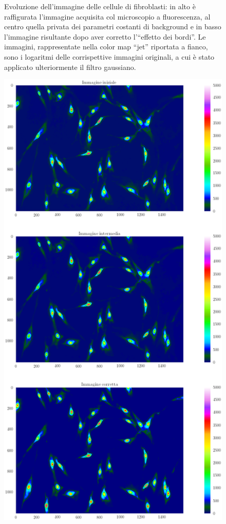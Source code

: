 \begin{figure}
 \caption{\small{Evoluzione dell'immagine delle cellule di fibroblasti: in alto è raffigurata l'immagine acquisita col microscopio a fluorescenza, al centro quella privata dei parametri costanti di background e in basso l'immagine risultante dopo aver corretto l'``effetto dei bordi''. Le immagini, rappresentate nella color map ``jet'' riportata a fianco, sono i logaritmi delle corrispettive immagini originali, a cui è stato applicato ulteriormente il filtro gaussiano.}}
 \label{fig:lg3}
\end{figure}

\begin{figure}
 \centering
 \includegraphics[scale=.50]{img/CAP4cmap.png}

\end{figure}
